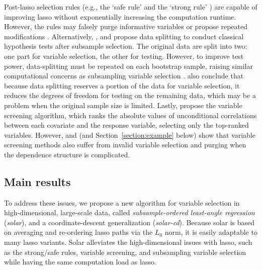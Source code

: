 \documentclass[11pt,authoryear]{elsarticle}
\begin{document}
Post-lasso selection rules (e.g., the `safe rule' \citep{ghaoui2010safe} and the `strong rule' \citep{tibshirani2012strong}) are capable of improving lasso without exponentially increasing the computation runtime. However, the rules may falsely purge informative variables or propose repeated modifications \citep{wang2014safe, zeng2017efficient}. Alternatively, \citet{wasserman2009high}, \citet{meinshausen2009p} and \citet{barber2019knockoff} propose data splitting to conduct classical hypothesis tests after subsample selection. The original data are split into two: one part for variable selection, the other for testing. However, to improve test power, data-splitting must be repeated on each bootstrap sample, raising similar computational concerns as subsampling variable selection \citep{bach2008bolasso,meinshausen2010stability}. \citet{diciccio2020exact} also conclude that because data splitting reserves a portion of the data for variable selection, it reduces the degrees of freedom for testing on the remaining data, which may be a problem when the original sample size is limited. Lastly, \citet{fan2008sure} propose the variable screening algorithm, which ranks the absolute values of unconditional correlations between each covariate and the response variable, selecting only the top-ranked variables. However, \citet{fan2008sure} and \citet{barut2016conditional} (and Section~\ref{section:example} below) show that variable screening methods also suffer from invalid variable selection and purging when the dependence structure is complicated.

\subsection{Main results}

To address these issues, we propose a new algorithm for variable selection in high-dimensional, large-scale data, called \emph{subsample-ordered least-angle regression} (\emph{solar}), and a coordinate-descent generalization (\emph{solar-cd}). Because solar is based on averaging and re-ordering lasso paths via the $L_0$ norm, it is easily adaptable to many lasso variants. Solar alleviates the high-dimensional issues with lasso, such as the strong/safe rules, variable screening, and subsampling variable selection while having the same computation load as lasso.
\end{document}
